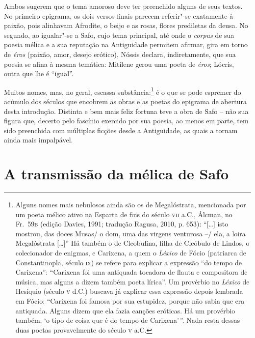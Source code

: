 Ambos sugerem que o tema amoroso deve ter preenchido alguns de seus textos. No
primeiro epigrama, os dois versos finais parecem referir"-se exatamente à
paixão, pois alinhavam Afrodite, o beijo e as rosas, flores prediletas da
deusa. No segundo, ao igualar"-se a Safo, cujo tema principal, até onde o
\textit{corpus} de sua poesia mélica e a sua reputação na Antiguidade permitem
afirmar, gira em torno de \textit{éros} (paixão, amor, desejo erótico), Nóssis
declara, indiretamente, que sua poesia se afina à mesma temática: Mitilene
gerou uma poeta de \textit{éros}; Lócris, outra que lhe é ``igual”.

Muitos nomes, mas, no geral, escassa substância:\footnote{Alguns nomes mais nebulosos ainda são
os de Megalóstrata, mencionada por um poeta mélico ativo na Esparta de fins do
século \textsc{vii} a.C., Álcman, no Fr.~59\textsc{b} (edição Davies, 1991;
tradução Ragusa, 2010, p. 653): ``[\ldots{}] isto mostrou, das doces
Musas/ o dom, uma das virgens venturosa --/ ela, a loira Megalóstrata [\ldots{}]'' Há
também o de Cleobulina, filha de Cleóbulo de Lindos, o colecionador de enigmas,
e Carixena, a quem o \textit{Léxico} de Fócio (patriarca de Constantinopla,
século \textsc{ix}) se refere para explicar a expressão ``do tempo de Carixena”:
``Carixena foi uma antiquada tocadora de flauta e compositora de música,
mas alguns a dizem também poeta lírica”. Um provérbio no \textit{Léxico} de
Hesíquio (século \textsc{v} d.C.) buscava já explicar essa expressão depois lembrada em
Fócio: ``Carixena foi famosa por sua estupidez, porque não sabia que era
antiquada. Alguns dizem que ela fazia canções eróticas. Há um provérbio também,
‘o tipo de coisa que é do tempo de Carixena’\,”. Nada resta dessas duas poetas
provavelmente do século \textsc{v} a.C.} é o que se pode espremer do acúmulo dos
séculos que encobrem as obras e as poetas do epigrama de abertura desta
introdução. Distinta e bem mais feliz fortuna teve a obra de Safo -- não sua
figura que, decerto pelo fascínio exercido por sua poesia, ao menos em parte,
tem sido preenchida com múltiplas ficções desde a Antiguidade, as quais a
tornam ainda mais impalpável. 

\section*{A transmissão da mélica de Safo}


